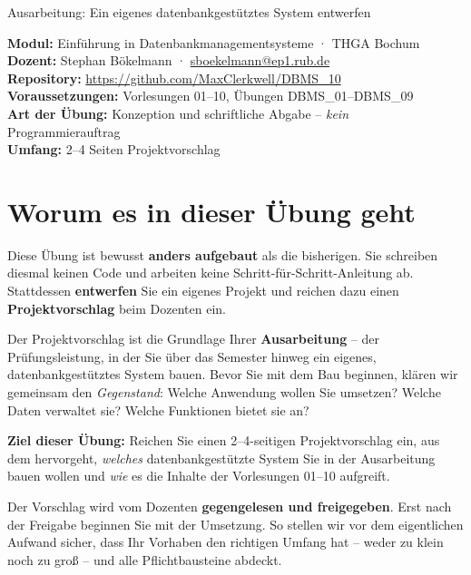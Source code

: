 \documentclass[11pt,a4paper]{article}
\begin{document}
\thispagestyle{empty}
%
{Ausarbeitung: Ein eigenes datenbankgestütztes System entwerfen}

\begin{infobox}
\textbf{Modul:} Einführung in Datenbankmanagementsysteme · THGA Bochum \\
\textbf{Dozent:} Stephan Bökelmann · \href{mailto:sboekelmann@ep1.rub.de}{sboekelmann@ep1.rub.de} \\
\textbf{Repository:} \url{https://github.com/MaxClerkwell/DBMS_10} \\
\textbf{Voraussetzungen:} Vorlesungen 01--10, Übungen DBMS\_01--DBMS\_09 \\
\textbf{Art der Übung:} Konzeption und schriftliche Abgabe -- \emph{kein} Programmierauftrag \\
\textbf{Umfang:} 2--4 Seiten Projektvorschlag
\end{infobox}

\tableofcontents
\vspace{1em}

\section{Worum es in dieser Übung geht}

Diese Übung ist bewusst \textbf{anders aufgebaut} als die bisherigen. Sie
schreiben diesmal keinen Code und arbeiten keine Schritt-für-Schritt-Anleitung
ab. Stattdessen \textbf{entwerfen} Sie ein eigenes Projekt und reichen dazu einen
\textbf{Projektvorschlag} beim Dozenten ein.

Der Projektvorschlag ist die Grundlage Ihrer \textbf{Ausarbeitung} -- der
Prüfungsleistung, in der Sie über das Semester hinweg ein eigenes,
datenbankgestütztes System bauen. Bevor Sie mit dem Bau beginnen, klären wir
gemeinsam den \emph{Gegenstand}: Welche Anwendung wollen Sie umsetzen? Welche
Daten verwaltet sie? Welche Funktionen bietet sie an?

\begin{infobox}
\textbf{Ziel dieser Übung:} Reichen Sie einen 2--4-seitigen Projektvorschlag
ein, aus dem hervorgeht, \emph{welches} datenbankgestützte System Sie in der
Ausarbeitung bauen wollen und \emph{wie} es die Inhalte der Vorlesungen 01--10
aufgreift.
\end{infobox}

Der Vorschlag wird vom Dozenten \textbf{gegengelesen und freigegeben}. Erst
nach der Freigabe beginnen Sie mit der Umsetzung. So stellen wir vor dem
eigentlichen Aufwand sicher, dass Ihr Vorhaben den richtigen Umfang hat --
weder zu klein noch zu groß -- und alle Pflichtbausteine abdeckt.
\end{document}

